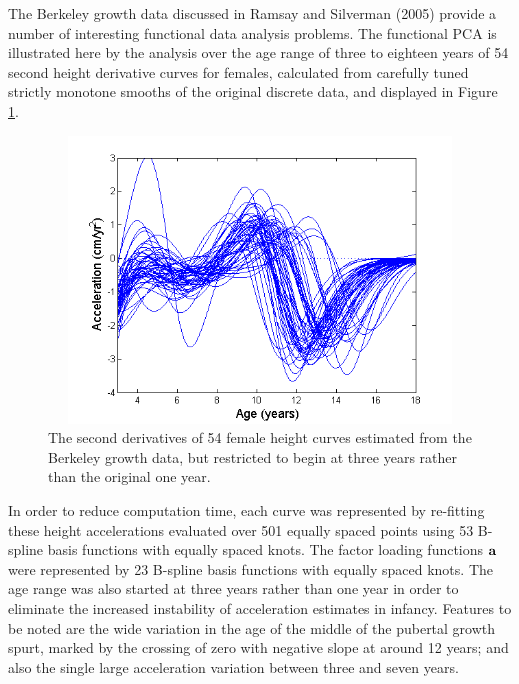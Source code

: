 \documentclass[12pt]{article}
\begin{document}
The Berkeley growth data discussed in Ramsay and Silverman (2005) provide a number of interesting functional data analysis problems.  The functional PCA is illustrated here by the analysis over the age range of three to eighteen years of 54 second height derivative curves for females, calculated from carefully tuned strictly monotone smooths of the original discrete data, and displayed in Figure \ref{FemaleAccel}.  

\begin{figure}
  \includegraphics[height=3in, width=5in]{figs/FemaleAccel}
  \caption{The second derivatives of 54 female height curves estimated from the Berkeley growth data, but restricted to begin at three years rather  than the original one year.}
  \label{FemaleAccel}
\end{figure}

In order to reduce computation time, each curve was represented by re-fitting these height accelerations evaluated over 501 equally spaced points using 53 B-spline basis functions with equally spaced knots.  The factor loading functions $\mbox{\bf a}$ were represented by 23 B-spline basis functions with equally spaced knots.  The age range was also started at three years rather than one year in order to eliminate the increased instability of acceleration estimates in infancy.  Features to be noted are the wide variation in the age of the middle of the pubertal growth spurt, marked by the crossing of zero with negative slope at around 12 years; and also the single large acceleration variation between three and seven years.
\end{document}
